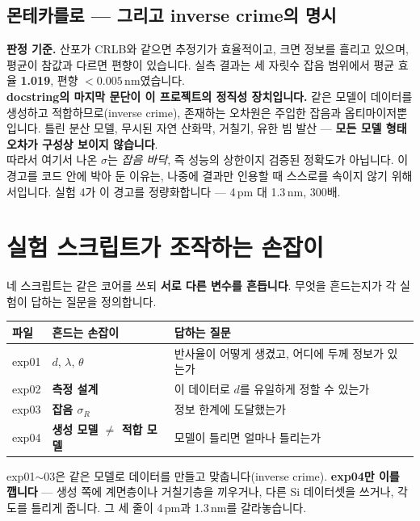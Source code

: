 \documentclass[10pt,a4paper]{article}
\newcommand{\note}[1]{%
  \begin{tcolorbox}[enhanced,breakable,colback=white,colframe=accent,
    boxrule=0pt,leftrule=1.6pt,arc=0pt,outer arc=0pt,
    left=6pt,right=2pt,top=3pt,bottom=3pt,boxsep=0pt,
    before skip=5pt, after skip=8pt]
  #1
  \end{tcolorbox}}
\begin{document}
\subsection{몬테카를로 — 그리고 inverse crime의 명시}

\note{
\textbf{판정 기준.} 산포가 CRLB와 같으면 추정기가 효율적이고, 크면 정보를 흘리고 있으며,
평균이 참값과 다르면 편향이 있습니다. 실측 결과는 세 자릿수 잡음 범위에서
평균 효율 \textbf{1.019}, 편향 $<0.005$\,nm였습니다.\\[4pt]
\textbf{docstring의 마지막 문단이 이 프로젝트의 정직성 장치입니다.} 같은 모델이 데이터를
생성하고 적합하므로(inverse crime), 존재하는 오차원은 주입한 잡음과 옵티마이저뿐입니다.
틀린 분산 모델, 무시된 자연 산화막, 거칠기, 유한 빔 발산 — \textbf{모든 모델 형태 오차가
구성상 보이지 않습니다}.\\[4pt]
따라서 여기서 나온 $\sigma$는 \emph{잡음 바닥}, 즉 성능의 상한이지 검증된 정확도가
아닙니다. 이 경고를 코드 안에 박아 둔 이유는, 나중에 결과만 인용할 때 스스로를
속이지 않기 위해서입니다. 실험 4가 이 경고를 정량화합니다 — 4\,pm 대 1.3\,nm, 300배.
}

\section{실험 스크립트가 조작하는 손잡이}

네 스크립트는 같은 코어를 쓰되 \textbf{서로 다른 변수를 흔듭니다}. 무엇을 흔드는지가
각 실험이 답하는 질문을 정의합니다.

\begin{center}
\begin{tabular}{@{}llp{7.6cm}@{}}
\toprule
파일 & 흔드는 손잡이 & 답하는 질문 \\
\midrule
exp01 & $d$, $\lambda$, $\theta$ & 반사율이 어떻게 생겼고, 어디에 두께 정보가 있는가 \\
exp02 & \textbf{측정 설계} & 이 데이터로 $d$를 유일하게 정할 수 있는가 \\
exp03 & \textbf{잡음 $\sigma_R$} & 정보 한계에 도달했는가 \\
exp04 & \textbf{생성 모델 $\neq$ 적합 모델} & 모델이 틀리면 얼마나 틀리는가 \\
\bottomrule
\end{tabular}
\end{center}

exp01$\sim$03은 같은 모델로 데이터를 만들고 맞춥니다(inverse crime).
\textbf{exp04만 이를 깹니다} — 생성 쪽에 계면층이나 거칠기층을 끼우거나, 다른 Si
데이터셋을 쓰거나, 각도를 틀리게 줍니다. 그 세 줄이 4\,pm과 1.3\,nm를 갈라놓습니다.
\end{document}
